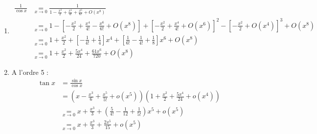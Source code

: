 \documentclass[../main.tex]{subfiles}
\begin{document}
\begin{enumerate}
    \item \begin{align*}
        \frac{1}{\cos x} &\underset{x\to 0}{=} \frac{1}{1 - \frac{x^2}{2} + \frac{x^4}{4!} + \frac{x^6}{6!} + O(x^8)} \\
        &\underset{x\to 0}{=} 1 - \left[ -\frac{x^2}{2} + \frac{x^4}{4!} - \frac{x^6}{6!} + O(x^8) \right] + \left[ -\frac{x^2}{2} + \frac{x^4}{4!} + O(x^6) \right]^2 - \left[ -\frac{x^2}{2} + O(x^4) \right]^3 + O(x^8) \\
        &\underset{x\to 0}{=} 1 + \frac{x^2}{2} + \left[ -\frac{1}{4!} + \frac{1}{4} \right] x^4 + \left[ \frac{1}{6!} - \frac{1}{4!} + \frac{1}{8} \right] x^6 + O(x^8) \\
        &\underset{x\to 0}{=} 1 + \frac{x^2}{2} + \frac{5x^4}{24} + \frac{61x^6}{720} + O(x^8)
    \end{align*}

    \item A l'ordre 5 :
    \begin{align*}
        \tan x &= \frac{\sin x}{\cos x} \\
        &= \left( x - \frac{x^3}{6} + \frac{x^5}{5!} + o(x^5) \right) \left( 1 + \frac{x^2}{2} + \frac{5x^4}{24} + o(x^4) \right) \\
        &\underset{x\to 0}{=} x + \frac{x^3}{3} + \left( \frac{5}{4!} - \frac{1}{12} + \frac{1}{5!} \right) x^5 + o(x^5) \\
        &\underset{x\to 0}{=} x + \frac{x^3}{3} + \frac{2x^5}{15} + o(x^5)
    \end{align*}
\end{enumerate}
\end{document}
